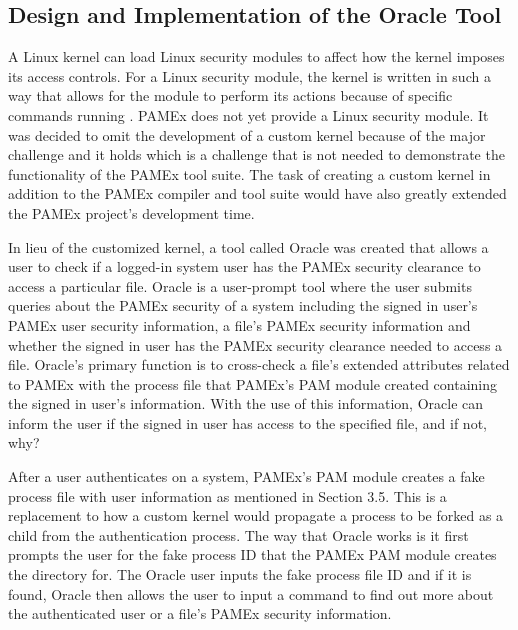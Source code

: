 \vspace{\baselineskip}

\subsection{Design and Implementation of the Oracle Tool}
\par 
\vspace{\baselineskip}
\hspace{1em}
A Linux kernel can load Linux security  modules to affect how the kernel imposes its access controls.
For a Linux security module, the kernel is written in such a way that 
allows for the module to perform its actions because of specific 
commands running \cite{kerneldocs}. PAMEx does not yet provide a Linux security module. 
It was decided to omit the development of a custom kernel because of the 
major challenge and it holds which is a challenge that is not needed to demonstrate the  
functionality of the PAMEx tool suite. The task of creating a custom 
kernel in addition to the PAMEx compiler and tool suite would have also 
greatly extended the PAMEx project’s development time.  

In lieu of the customized kernel, a tool called 
Oracle was created that allows a user to check if a logged-in system user has the 
PAMEx security clearance to access a particular file. Oracle is a 
user-prompt tool where the user submits queries about the PAMEx 
security of a system including the signed in user’s PAMEx user security 
information, a file’s PAMEx security information and whether the signed 
in user has the PAMEx security clearance needed to access a file. 
Oracle’s primary function is to cross-check a file’s extended 
attributes related to PAMEx with the process file that PAMEx’s PAM 
module created containing the signed in user’s information. With the 
use of this information, Oracle can inform the user if the signed in 
user has access to the specified file, and if not, why? 

After a user authenticates on a system, PAMEx's PAM module creates a fake
process file with user information as mentioned in Section 3.5.
This is a replacement to how a custom kernel would propagate a process
to be forked as a child from the authentication process. 
The way that Oracle works is it first prompts the user for the fake 
process ID that the PAMEx PAM module creates the directory for. The 
Oracle user inputs the fake process file ID and if it is found, Oracle then 
allows the user to input a command to find out more about the 
authenticated user or a file’s PAMEx security information.  

